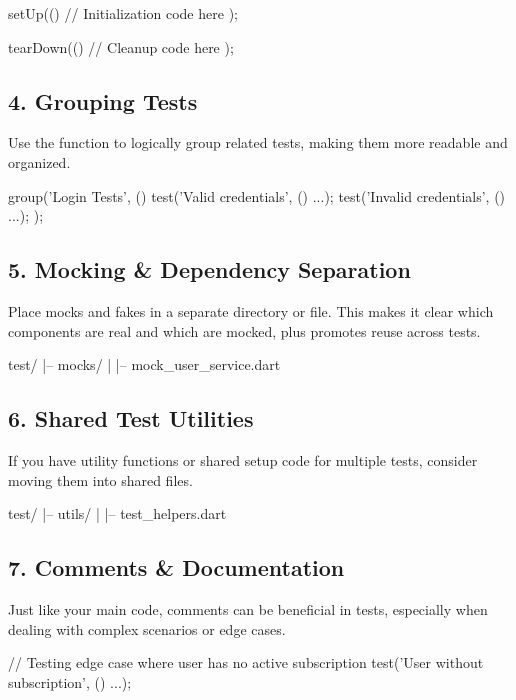 \begin{dartcode}
setUp(() {
  // Initialization code here
});

tearDown(() {
  // Cleanup code here
});
\end{dartcode}

\subsection*{4. Grouping Tests}

Use the  function to logically group related tests, making them more readable and organized.

\begin{dartcode}
group('Login Tests', () {
  test('Valid credentials', () {...});
  test('Invalid credentials', () {...});
});
\end{dartcode}

\subsection*{5. Mocking \& Dependency Separation}

Place mocks and fakes in a separate directory or file. This makes it clear which components are real and which are mocked, plus promotes reuse across tests.

\begin{yamlcode}
test/
|-- mocks/
|   |-- mock_user_service.dart
\end{yamlcode}

\subsection*{6. Shared Test Utilities}

If you have utility functions or shared setup code for multiple tests, consider moving them into shared files.

\begin{yamlcode}
test/
|-- utils/
|   |-- test_helpers.dart
\end{yamlcode}

\subsection*{7. Comments \& Documentation}

Just like your main code, comments can be beneficial in tests, especially when dealing with complex scenarios or edge cases.

\begin{dartcode}
// Testing edge case where user has no active subscription
test('User without subscription', () {...});
\end{dartcode}

